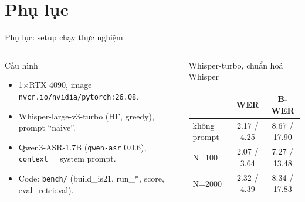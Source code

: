 \documentclass[aspectratio=169,xcolor=table]{beamer}
\begin{document}
\section{Phụ lục}
\begin{frame}{Phụ lục: setup chạy thực nghiệm}
\small
\begin{columns}[T,onlytextwidth]
\begin{block}{Cấu hình}
\begin{itemize}\itemsep2pt
\item 1$\times$RTX 4090, image \texttt{nvcr.io/nvidia/pytorch:26.08}.
\item Whisper-large-v3-turbo (HF, greedy), prompt ``naive''.
\item Qwen3-ASR-1.7B (\texttt{qwen-asr} 0.0.6), \texttt{context} = system prompt.
\item Code: \texttt{bench/} (build\_is21, run\_*, score, eval\_retrieval).
\end{itemize}
\end{block}
\begin{block}{Whisper-turbo, chuẩn hoá Whisper}
\renewcommand{\arraystretch}{1.15}
\begin{tabular}{@{}lcc@{}}
\toprule
& WER & B-WER\\
\midrule
không prompt & 2.17 / 4.25 & 8.67 / 17.90\\
N=100 & 2.07 / 3.64 & 7.27 / 13.48\\
N=2000 & 2.32 / 4.39 & 8.34 / 17.83\\
\bottomrule
\end{tabular}
\end{block}
\end{columns}
\end{frame}
\end{document}
